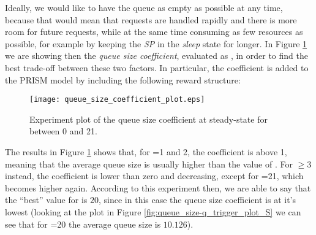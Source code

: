 {      Ideally, we would like to have the queue as empty as possible at any time, because that would mean that requests are handled rapidly and there is more room for future requests, while at the same time consuming as few resources as possible, for example by keeping the \textit{SP} in the \textit{sleep} state for longer. In Figure \ref{fig:queue_size_coefficient_plot} we are showing then the \textit{queue size coefficient}, evaluated as , in order to find the best trade-off between these two factors. In particular, the coefficient is added to the PRISM model by including the following reward structure:
      
      
      
    	\begin{figure}[h!]
    		\begin{center}
    			\texttt{[image: queue\_size\_coefficient\_plot.eps]}
    		\end{center}
    		\caption{Experiment plot of the queue size coefficient at steady-state for  between 0 and 21.}
    		\label{fig:queue_size_coefficient_plot}
    	\end{figure}
      
      The results in Figure \ref{fig:queue_size_coefficient_plot} shows that, for =1 and 2, the coefficient is above 1, meaning that the average queue size is usually higher than the value of . For $\geq 3$ instead, the coefficient is lower than zero and decreasing, except for =21, which becomes higher again. According to this experiment then, we are able to say that the ``best'' value for  is $20$, since in this case the queue size coefficient is at it's lowest (looking at the plot in Figure \ref{fig:queue_size-q_trigger_plot_S} we can see that for =20 the average queue size is $10.126$).
    }
    
    
